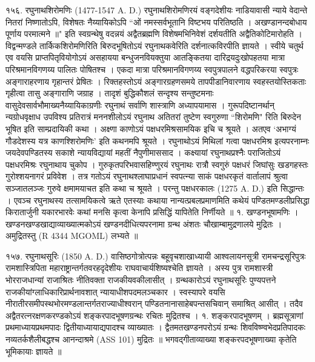 १५६. रघुनाथशिरोमणिः (1477-1547 A. D.)
रघुनाथशिरोमणिरयं वङ्गदेशीयः नाडियावासी न्याये वेदान्ते नितरां निष्णातोऽपि, विशेषतः नैय्यायिकोऽपि
``ओं नमस्सर्वभूतानि विष्टभय परितिष्ठति ।
अखण्डानन्दबोधाय पूर्णाय परमात्मने ॥"
इति स्वग्रन्थेषु वदन्नयं अद्वैतब्रह्मणि विशेषमभिनिवेशं दर्शयतीति अद्वैतिकोटिमारोहति । विद्वन्मण्डले तार्किकशिरोमणिरिति बिरुदभूषितोऽयं रघुनाथकवेरिति दर्शनात्कविरपीति ज्ञायते । स्वीये चतुर्थ एव वयसि प्राप्तपितृवियोगोऽयं असहायया बन्धुजनवियक्तुया आतङ्कितया दारिद्रयदुःखोपहतया मात्रा परिश्रमानविगणय्य पालितः पोषितश्च । एकदा मात्रा परिश्रमानविगणय्य स्वपुत्रपालने वद्धपरिकरया स्वपुत्रः अङ्गाराहरणाय गृहान्तरं प्रेषितः । रिक्तहस्तोऽयं अङ्गारग्रहणसमये तापपीडानिवारणाय स्वहस्तयोस्तिकताः गृहीत्वा तासु अङ्गाराणि जग्राह । तादृशं बुद्धिकौशलं सन्दृश्य सन्तुष्टमनाः वासुदेवसार्वभौमाख्यनैय्यायिकाग्रणीः रघुनाथं सर्वाणि शास्त्राणि अध्यापयामास । गुरूपदिष्टानर्थान् न्यग्रोधवृक्षाध उपविश्य प्रतिरात्रं मननशीलोऽयं रघुनाथ अतितरां तुष्टेण स्वगुरुणा ``शिरोमणि" रिति बिरुदेन भूषित इति साम्प्रदायिकी कथा ।
अक्ष्णा काणोऽयं पक्षधरमिश्रसामयिक इचि च श्रूयते । अतएव `अभाग्यं गौडदेशस्य यत्र काणश्शिरोमणिः' इति कथनमपि श्रूयते । रघुनाथोऽयं मिथिलां गत्वा पक्षधरमिश्र इत्यपरनाम्नः जयदेवपण्डितस्य सकाशे न्यायविद्यायां महतीं नैपुणीमाससाद । कक्ष्यायां रघुनाथप्रश्नैः पराजितोऽयं पक्षधरमिश्रः रघुनाथाय चुकोप । गुरुकृतपरिभवासहिण्णुरयं रघुनाथः रात्रौ स्वगुरुं पक्षधरं जिघांसुः खडगहस्तः गुरोश्शयनागरं प्रविवेश । तत्र गतोऽयं रघुनाथश्लाघाप्रधानं स्वपत्न्या साकं पक्षधरकृतं वार्तालापं श्रुत्वा सञ्जातलञ्जः गुरुवे क्षमामयाचत इति कथा च श्रूयते ।
परन्तु पक्षधरकालः (1275 A. D.) इति सिद्धान्तः । एवञ्च रघुनाथस्य तत्सामयिकत्वे ऋते एतस्याः कथाया नान्यत्प्रबलप्रमाणमिति कथेयं पण्डितमण्डलीप्रसिद्धा किरातार्जुनी यकारभारवेः कथां मनसि कृत्वा केनापि प्रसिद्धिं यापितेति निर्णीयते ॥
१. खण्डनभूषामणिः ।
खण्डनखण्डखाद्याव्याख्यात्मकोऽयं खण्डनदीधित्यपरनामा ग्रन्थ अंशतः चौखाम्बामुद्रणालये मुद्रितः । अमुद्रितस्तु (R 4344 MGOML) लभ्यते ॥

१५७. रघुनाथसूरिः (1850 A. D.)
वासिष्ठगोत्रोत्पन्नः बहूवृचशाखाध्यायी आश्वलायनसूत्री रामचन्द्रसूरिपुत्रः रामशास्त्रिपिता महाराष्ट्रान्तर्गतवरहदृदेशीयः राघवाचार्यशिष्यश्चेति ज्ञायते । अस्य पुत्र रामशास्त्री भोरराजधान्यां राजाश्रितः नीतिवक्ता राजकीयवकीलासीत् । ग्रन्थकारोऽयं रघुनाथसूरिः पुण्यपत्तने राजकीयांग्लाधिकारिप्रार्थनावशात् न्यायाधीशपदमलञ्चकार । स्वस्यापरे वयसि नीरातीरसमीपस्थभोरमण्डलान्तर्गतराज्याधीश्वरान् पण्डितनानासाहेबपन्तसचिवान् समाश्रित् आसीत् । तदैव अद्वैतरत्नरक्षणकरण्डकोऽयं शङ्करपादभूषणग्रन्थः रचितः मुद्रितश्च ।
१. शङ्करपादभूषणम् । ब्रह्मसूत्राणां प्रथमाध्यायप्रथमपादः द्वितीयाध्यायाद्यपादश्च व्याख्यातः । द्वैतमतखण्डनपरोऽयं ग्रन्थः शिवविष्ण्वभेदप्रतिपादकः नव्यतर्कशैलीबद्धश्च आनन्दाश्रमे (ASS 101) मुद्रितः ॥ भगवद्गीताव्याख्या शङ्करपदभूषणाख्या कृतेति भूमिकायाः ज्ञायते ॥

